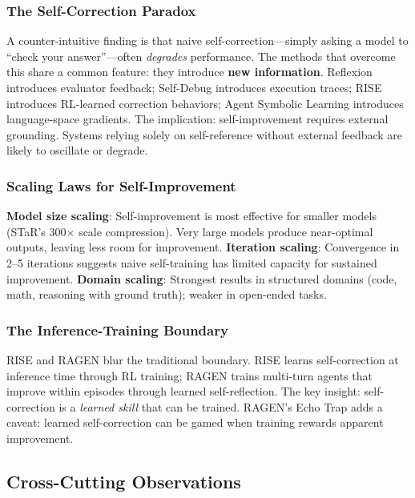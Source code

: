 \subsubsection{The Self-Correction Paradox}

A counter-intuitive finding is that naive self-correction---simply asking a model to ``check your answer''---often \emph{degrades} performance. The methods that overcome this share a common feature: they introduce \textbf{new information}. Reflexion introduces evaluator feedback; Self-Debug introduces execution traces; RISE introduces RL-learned correction behaviors; Agent Symbolic Learning introduces language-space gradients. The implication: self-improvement requires external grounding. Systems relying solely on self-reference without external feedback are likely to oscillate or degrade.

\subsubsection{Scaling Laws for Self-Improvement}

\textbf{Model size scaling}: Self-improvement is most effective for smaller models (STaR's 300$\times$ scale compression). Very large models produce near-optimal outputs, leaving less room for improvement. \textbf{Iteration scaling}: Convergence in 2--5 iterations suggests naive self-training has limited capacity for sustained improvement. \textbf{Domain scaling}: Strongest results in structured domains (code, math, reasoning with ground truth); weaker in open-ended tasks.

\subsubsection{The Inference-Training Boundary}

RISE and RAGEN blur the traditional boundary. RISE learns self-correction at inference time through RL training; RAGEN trains multi-turn agents that improve within episodes through learned self-reflection. The key insight: self-correction is a \emph{learned skill} that can be trained. RAGEN's Echo Trap adds a caveat: learned self-correction can be gamed when training rewards apparent improvement.

\subsection{Cross-Cutting Observations}
\label{sec:cross-cutting}

